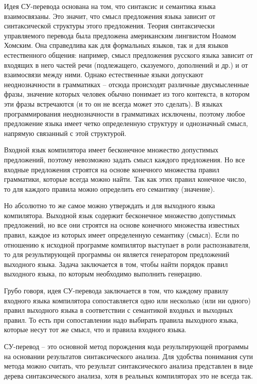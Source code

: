 Идея СУ-перевода основана на том, что синтаксис и семантика языка взаимосвязаны. Это значит, что смысл предложения языка зависит от синтаксической структуры этого предложения. Теория синтаксически управляемого перевода была предложена американским лингвистом Ноамом Хомским. Она справедлива как для формальных языков, так и для языков естественного общения: например, смысл предложения русского языка зависит от входящих в него частей речи (подлежащего, сказуемого, дополнений и др.) и от взаимосвязи между ними. Однако естественные языки допускают неоднозначности в грамматиках – отсюда происходят различные двусмысленные фразы, значение которых человек обычно понимает из того контекста, в котором эти фразы встречаются (и то он не всегда может это сделать). В языках программирования неоднозначности в грамматиках исключены, поэтому любое предложение языка имеет четко определенную структуру и однозначный смысл, напрямую связанный с этой структурой.

Входной язык компилятора имеет бесконечное множество допустимых предложений, поэтому невозможно задать смысл каждого предложения. Но все входные предложения строятся на основе конечного множества правил грамматики, которые всегда можно найти. Так как этих правил конечное число, то для каждого правила можно определить его семантику (значение).

Но абсолютно то же самое можно утверждать и для выходного языка компилятора. Выходной язык содержит бесконечное множество допустимых предложений, но все они строятся на основе конечного множества известных правил, каждое из которых имеет определенную семантику (смысл). Если по отношению к исходной программе компилятор выступает в роли распознавателя, то для результирующей программы он является генератором предложений выходного языка. Задача заключается в том, чтобы найти порядок правил выходного языка, по которым необходимо выполнить генерацию.

Грубо говоря, идея СУ-перевода заключается в том, что каждому правилу входного языка компилятора сопоставляется одно или несколько (или ни одного) правил выходного языка в соответствии с семантикой входных и выходных правил. То есть при сопоставлении надо выбирать правила выходного языка, которые несут тот же смысл, что и правила входного языка.

СУ-перевод – это основной метод порождения кода результирующей программы на основании результатов синтаксического анализа. Для удобства понимания сути метода можно считать, что результат синтаксического анализа представлен в виде дерева синтаксического анализа, хотя в реальных компиляторах это не всегда так.

